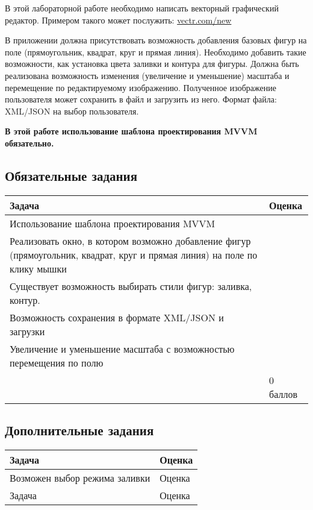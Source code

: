 \documentclass[a4paper, 13pt]{article}
\newcommand{\labstablefraction}{1/10}
\newcommand{\labstablescore}{\textwidth * \labstablefraction}
\newcommand{\labstabletask}{\textwidth * (1 - \labstablefraction) - \labstablescore - 0.83cm}
\begin{document}
В этой лабораторной работе необходимо написать векторный графический редактор. Примером такого может послужить: \url{vectr.com/new}

В приложении должна присутствовать возможность добавления базовых фигур на поле (прямоугольник, квадрат, круг и прямая линия). 
Необходимо добавить такие возможности, как установка цвета заливки и контура для фигуры. 
Должна быть реализована возможность изменения (увеличение и уменьшение) масштаба и перемещение по редактируемому изображению. 
Полученное изображение пользователя может сохранить в файл и загрузить из него. Формат файла: XML/JSON на выбор пользователя.

\textbf{В этой работе использование шаблона проектирования MVVM обязательно.}

\subsection{Обязательные задания}

\begin{table}[hbt]
\begin{tabular}{|p{\labstabletask}|p{\labstablescore}|}
\hline
Задача
& Оценка   \\ \hline
Использование шаблона проектирования MVVM
&  \\ \hline
Реализовать окно, в котором возможно добавление фигур (прямоугольник, квадрат, круг и прямая линия) на поле по клику мышки
&  \\ \hline
Существует возможность выбирать стили фигур: заливка, контур.
&  \\ \hline
Возможность сохранения в формате XML/JSON и загрузки
&  \\ \hline
Увеличение и уменьшение масштаба с возможностью перемещения по полю
&  \\ \hline
& 0 баллов \\ \hline
\end{tabular}
\end{table}

\subsection{Дополнительные задания}

\begin{table}[hbt]
\begin{tabular}{|p{\labstabletask}|p{\labstablescore}|}
\hline
Задача
& Оценка   \\ \hline
Возможен выбор режима заливки
& Оценка   \\ \hline
Задача
& Оценка   \\ \hline

\end{tabular}
\end{table}
\end{document}
